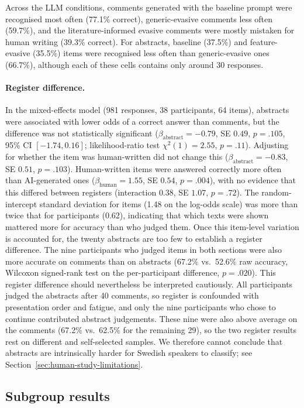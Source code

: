 \documentclass[thesis]{cluu}
\begin{document}
Across the LLM conditions, comments generated with the baseline prompt were recognised most often (77.1\% correct), generic-evasive comments less often (59.7\%), and the literature-informed evasive comments were mostly mistaken for human writing (39.3\% correct). For abstracts, baseline (37.5\%) and feature-evasive (35.5\%) items were recognised less often than generic-evasive ones (66.7\%), although each of these cells contains only around 30 responses.

\paragraph{Register difference.} In the mixed-effects model (981 responses, 38 participants, 64 items), abstracts were associated with lower odds of a correct answer than comments, but the difference was not statistically significant ($\beta_{\text{abstract}}=-0.79$, SE $0.49$, $p=.105$, 95\% CI $[-1.74, 0.16]$; likelihood-ratio test $\chi^2(1)=2.55$, $p=.11$). Adjusting for whether the item was human-written did not change this ($\beta_{\text{abstract}}=-0.83$, SE $0.51$, $p=.103$). Human-written items were answered correctly more often than AI-generated ones ($\beta_{\text{human}}=1.55$, SE $0.54$, $p=.004$), with no evidence that this differed between registers (interaction $0.38$, SE $1.07$, $p=.72$). The random-intercept standard deviation for items (1.48 on the log-odds scale) was more than twice that for participants (0.62), indicating that which texts were shown mattered more for accuracy than who judged them. Once this item-level variation is accounted for, the twenty abstracts are too few to establish a register difference. The nine participants who judged items in both sections were also more accurate on comments than on abstracts (67.2\% vs.\ 52.6\% raw accuracy, Wilcoxon signed-rank test on the per-participant difference, $p=.020$). This register difference should nevertheless be interpreted cautiously. All participants judged the abstracts after 40 comments, so register is confounded with presentation order and fatigue, and only the nine participants who chose to continue contributed abstract judgements. These nine were also above average on the comments (67.2\% vs.\ 62.5\% for the remaining 29), so the two register results rest on different and self-selected samples. We therefore cannot conclude that abstracts are intrinsically harder for Swedish speakers to classify; see Section~\ref{sec:human-study-limitations}.

\subsection{Subgroup results}
\label{sec:human-subgroups}
\end{document}
